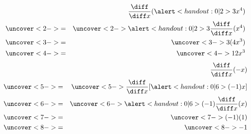 \begin{frame}
\begin{example}[Example 2, p. 137]
\begin{columns}[t]
\begin{eqnarray*}
& & \frac{\diff}{\diff x} (\alert<handout:0| 2>{3}x^4)\\
& \uncover<2->{ = } & %
\uncover<2->{\alert<handout:0| 2>{3}\frac{\diff}{\diff x}(x^4)}\\
& \uncover<3->{ = } & %
\uncover<3->{3(4x^3)}\\
& \uncover<4->{ = } & %
\uncover<4->{12x^3}\\
\end{eqnarray*}
\begin{eqnarray*}
& & \frac{\diff}{\diff x} (-x)\\
& \uncover<5->{ = } & %
\uncover<5->{\frac{\diff}{\diff x}[\alert<handout:0| 6>{(-1)}x]}\\
& \uncover<6->{ = } & %
\uncover<6->{\alert<handout:0| 6>{(-1)}\frac{\diff}{\diff x}(x)}\\
& \uncover<7->{ = } & %
\uncover<7->{(-1)(1)}\\
& \uncover<8->{ = } & %
\uncover<8->{-1}\\
\end{eqnarray*}
\end{columns}
\end{example}
\end{frame}
